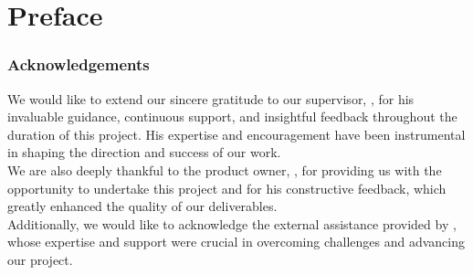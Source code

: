 \chapter*{Preface}

\subsection*{Acknowledgements}

We would like to extend our sincere gratitude to our supervisor, \textbf{\saleh}, for his invaluable guidance, continuous support, and insightful feedback throughout the duration of this project. His expertise and encouragement have been instrumental in shaping the direction and success of our work. \\

We are also deeply thankful to the product owner, \textbf{\arne}, for providing us with the opportunity to undertake this project and for his constructive feedback, which greatly enhanced the quality of our deliverables. \\

Additionally, we would like to acknowledge the external assistance provided by \textbf{\peter}, whose expertise and support were crucial in overcoming challenges and advancing our project.